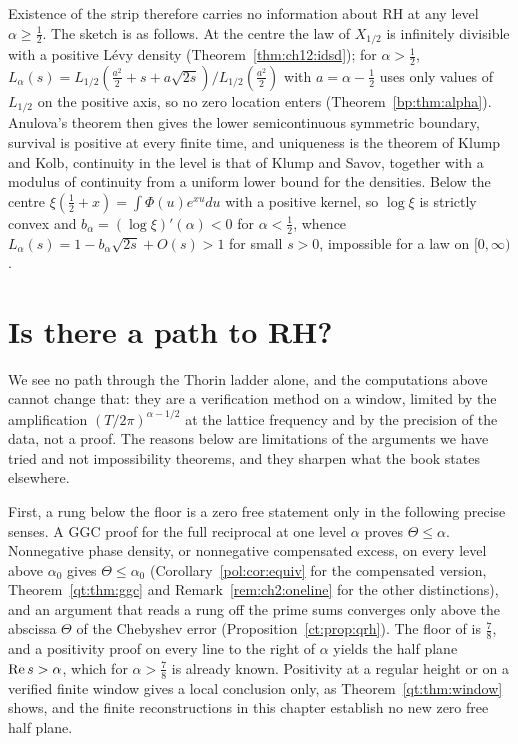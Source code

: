 Existence of the strip therefore carries no information about RH at any level $\alpha\ge\tfrac12$. The sketch is as follows. At the centre the law of $X_{1/2}$ is infinitely divisible with a positive L\'evy density (Theorem~\ref{thm:ch12:idsd}); for $\alpha>\tfrac12$, $L_\alpha(s)=L_{1/2}(\tfrac{a^2}2+s+a\sqrt{2s})/L_{1/2}(\tfrac{a^2}2)$ with $a=\alpha-\tfrac12$ uses only values of $L_{1/2}$ on the positive axis, so no zero location enters (Theorem~\ref{bp:thm:alpha}). Anulova's theorem then gives the lower semicontinuous symmetric boundary, survival is positive at every finite time, and uniqueness is the theorem of Klump and Kolb, continuity in the level is that of Klump and Savov, together with a modulus of continuity from a uniform lower bound for the densities. Below the centre $\xi(\tfrac12+x)=\int\Phi(u)e^{xu}du$ with a positive kernel, so $\log\xi$ is strictly convex and $b_\alpha=(\log\xi)'(\alpha)<0$ for $\alpha<\tfrac12$, whence $L_\alpha(s)=1-b_\alpha\sqrt{2s}+O(s)>1$ for small $s>0$, impossible for a law on $[0,\infty)$. %


\section{Is there a path to RH?}\label{qt:sec:path}

We see no path through the Thorin ladder alone, and the computations above cannot change that: they are a verification method on a window, limited by the amplification $(T/2\pi)^{\alpha-1/2}$ at the lattice frequency and by the precision of the data, not a proof. The reasons below are limitations of the arguments we have tried and not impossibility theorems, and they sharpen what the book states elsewhere.

First, a rung below the floor is a zero free statement only in the following precise senses. A GGC proof for the full reciprocal at one level $\alpha$ proves $\Theta\le\alpha$. Nonnegative phase density, or nonnegative compensated excess, on every level above $\alpha_0$ gives $\Theta\le\alpha_0$ (Corollary~\ref{pol:cor:equiv} for the compensated version, Theorem~\ref{qt:thm:ggc} and Remark~\ref{rem:ch2:oneline} for the other distinctions), and an argument that reads a rung off the prime sums converges only above the abscissa $\Theta$ of the Chebyshev error (Proposition~\ref{ct:prop:qrh}). The floor of \cite{OAI26a} is $\frac78$, and a positivity proof on every line to the right of $\alpha$ yields the half plane $\operatorname{Re} s>\alpha$, which for $\alpha>\frac78$ is already known. Positivity at a regular height or on a verified finite window gives a local conclusion only, as Theorem~\ref{qt:thm:window} shows, and the finite reconstructions in this chapter establish no new zero free half plane.


